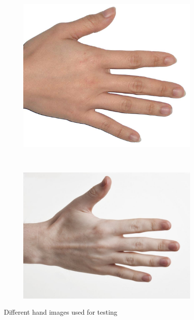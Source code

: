 \begin{figure}[H]
\begin{subfigure}[b]{0.20\textwidth}
        \includegraphics[width=\textwidth]{images/hand_light}
        \caption{}\label{img:input_hands_1_light}
    \end{subfigure}
    ~
    \begin{subfigure}[b]{0.20\textwidth}
        \includegraphics[width=\textwidth]{images/hand_pale}
        \caption{}\label{img:input_hands_1_pale}
    \end{subfigure}
    \caption{Different hand images used for testing}\label{img:input_hands_1}
\end{figure}

